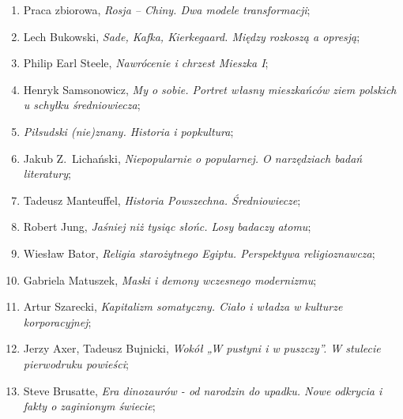 \documentclass[a4paper,11pt]{article}
\begin{document}
\begin{enumerate}
\item Praca zbiorowa, \textit{Rosja -- Chiny. Dwa modele transformacji};



\item Lech Bukowski, \textit{Sade, Kafka, Kierkegaard. Między rozkoszą a
    opresją};



\item Philip Earl Steele, \textit{Nawrócenie i chrzest Mieszka I};



\item Henryk Samsonowicz, \textit{My o sobie. Portret własny mieszkańców
    ziem polskich u schyłku średniowiecza};



\item \textit{Piłsudski (nie)znany. Historia i popkultura};



\item Jakub Z.~Lichański, \textit{Niepopularnie o popularnej. O
    narzędziach badań literatury};



\item Tadeusz Manteuffel, \textit{Historia Powszechna. Średniowiecze};



\item Robert Jung, \textit{Jaśniej niż tysiąc słońc. Losy badaczy
    atomu};



\item Wiesław Bator, \textit{Religia starożytnego Egiptu. Perspektywa
    religioznawcza};



\item Gabriela Matuszek, \textit{Maski i demony wczesnego modernizmu};



\item Artur Szarecki, \textit{Kapitalizm somatyczny. Ciało i władza w
    kulturze korporacyjnej};



\item Jerzy Axer, Tadeusz Bujnicki, \textit{Wokół „W pustyni i w
    puszczy”. W stulecie pierwodruku powieści};



\item Steve Brusatte, \textit{Era dinozaurów - od narodzin do upadku.
    Nowe odkrycia i fakty o zaginionym świecie};




\end{enumerate}
\end{document}
